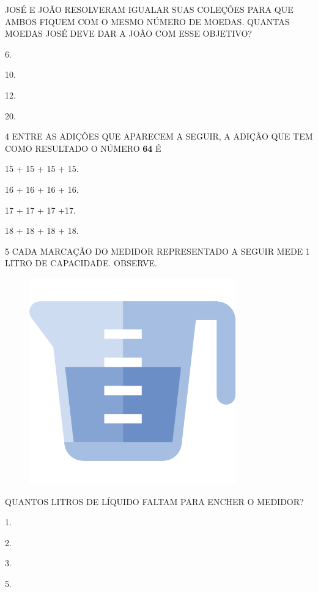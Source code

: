 JOSÉ E JOÃO RESOLVERAM IGUALAR SUAS COLEÇÕES PARA QUE AMBOS FIQUEM COM O MESMO NÚMERO DE MOEDAS. QUANTAS MOEDAS JOSÉ DEVE DAR A JOÃO COM ESSE OBJETIVO?

\begin{escolha}[itemsep=0pt]
\item 6.

\item 10.

\item 12.

\item 20.
\end{escolha}

\num{4} ENTRE AS ADIÇÕES QUE APARECEM A SEGUIR, A ADIÇÃO QUE 
TEM COMO RESULTADO O NÚMERO \textbf{64} É

\begin{escolha}[itemsep=0pt]
\item 15 + 15 + 15 + 15.

\item 16 + 16 + 16 + 16.

\item 17 + 17 + 17 +17.

\item 18 + 18 + 18 + 18.
\end{escolha}

\pagebreak
\num{5} CADA MARCAÇÃO DO MEDIDOR REPRESENTADO A SEGUIR MEDE 1 LITRO DE CAPACIDADE. OBSERVE.


\begin{figure}[H]
\centering
\includegraphics[width=.2\textwidth]{media/image113.png}
\end{figure}

QUANTOS LITROS DE LÍQUIDO FALTAM PARA ENCHER O MEDIDOR?

\begin{escolha}[itemsep=0pt]
\item 1.

\item 2.

\item 3.

\item 5.
\end{escolha}

